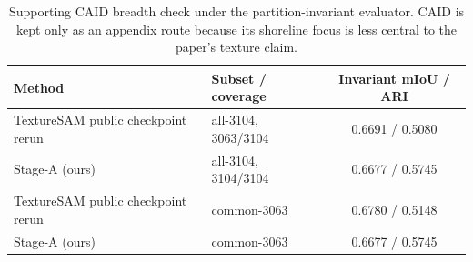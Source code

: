\begin{table}[t]
\centering
\scriptsize
\begin{tabularx}{\textwidth}{@{}Xlc@{}}
\toprule
Method & Subset / coverage & Invariant mIoU / ARI \\
\midrule
TextureSAM public checkpoint rerun & all-3104, 3063/3104 & 0.6691 / 0.5080 \\
\sys{} Stage-A (ours) & all-3104, 3104/3104 & 0.6677 / 0.5745 \\
TextureSAM public checkpoint rerun & common-3063 & 0.6780 / 0.5148 \\
\sys{} Stage-A (ours) & common-3063 & 0.6677 / 0.5745 \\
\bottomrule
\end{tabularx}
\caption{Supporting CAID breadth check under the partition-invariant evaluator. CAID is kept only as an appendix route because its shoreline focus is less central to the paper's texture claim.}
\label{tab:caid_secondary}
\end{table}
